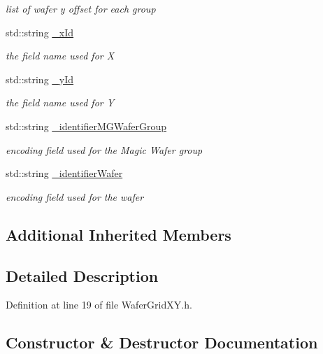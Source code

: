 \begin{DoxyCompactItemize}
\begin{DoxyCompactList}\small\item\em list of wafer y offset for each group \end{DoxyCompactList}\item 
std\+::string \hyperlink{class_d_d4hep_1_1_d_d_segmentation_1_1_wafer_grid_x_y_ac90f589f06ac860a0015e6a5e46b081b}{\+\_\+x\+Id}
\begin{DoxyCompactList}\small\item\em the field name used for X \end{DoxyCompactList}\item 
std\+::string \hyperlink{class_d_d4hep_1_1_d_d_segmentation_1_1_wafer_grid_x_y_ac81f2246c4f13a9299036aab012d5887}{\+\_\+y\+Id}
\begin{DoxyCompactList}\small\item\em the field name used for Y \end{DoxyCompactList}\item 
std\+::string \hyperlink{class_d_d4hep_1_1_d_d_segmentation_1_1_wafer_grid_x_y_ae4552eda8798fc3fb8c4bd155a7ee6eb}{\+\_\+identifier\+M\+G\+Wafer\+Group}
\begin{DoxyCompactList}\small\item\em encoding field used for the Magic Wafer group \end{DoxyCompactList}\item 
std\+::string \hyperlink{class_d_d4hep_1_1_d_d_segmentation_1_1_wafer_grid_x_y_aec0c4ade6e6eed2c87623f7e675b5fd1}{\+\_\+identifier\+Wafer}
\begin{DoxyCompactList}\small\item\em encoding field used for the wafer \end{DoxyCompactList}\end{DoxyCompactItemize}
\subsection*{Additional Inherited Members}


\subsection{Detailed Description}


Definition at line 19 of file Wafer\+Grid\+X\+Y.\+h.



\subsection{Constructor \& Destructor Documentation}
\hypertarget{class_d_d4hep_1_1_d_d_segmentation_1_1_wafer_grid_x_y_af8bf027d4db4e41a774451c0479e0e58}{}\label{class_d_d4hep_1_1_d_d_segmentation_1_1_wafer_grid_x_y_af8bf027d4db4e41a774451c0479e0e58} 
